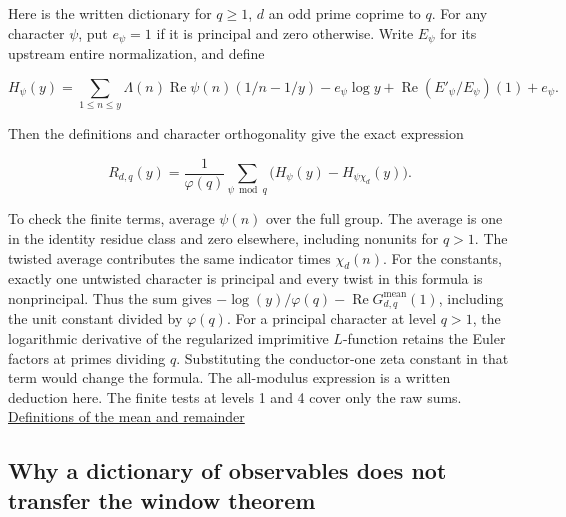 \documentclass[11pt,letterpaper]{article}
\begin{document}
Here is the written dictionary for $q\ge 1$, $d$ an odd prime coprime to $q$. For any character $\psi $, put $e_\psi =1$ if it is principal and zero otherwise. Write $E_\psi $ for its upstream entire normalization, and define

\[
H_\psi (y)=\sum_{1\le n\le y}\Lambda(n)\operatorname{Re}\psi (n)(1/n-1/y)
-e_\psi \log y+\operatorname{Re}(E'_\psi /E_\psi )(1)+e_\psi  .
\]

Then the definitions and character orthogonality give the exact expression

\[
R_{d,q}(y)=\frac1{\varphi(q)}
\sum_{\psi \bmod q}\bigl(H_\psi (y)-H_{\psi \chi _d}(y)\bigr).
\]

To check the finite terms, average $\psi (n)$ over the full group. The average is one in the identity residue class and zero elsewhere, including nonunits for $q>1$. The twisted average contributes the same indicator times $\chi _d(n)$. For the constants, exactly one untwisted character is principal and every twist in this formula is nonprincipal. Thus the sum gives $-\log(y)/\varphi(q)-\operatorname{Re} G^{\mathrm{mean}}_{d,q}(1)$, including the unit constant divided by $\varphi(q)$. For a principal character at level $q>1$, the logarithmic derivative of the regularized imprimitive $L$-function retains the Euler factors at primes dividing $q$. Substituting the conductor-one zeta constant in that term would change the formula. The all-modulus expression is a written deduction here. The finite tests at levels 1 and 4 cover only the raw sums. \href{https://github.com/nousentllc/riemann-hypothesis/blob/e063a923620ee7787b4a1270421478645bf66bdb/src/New/Reduction/Zeros/PrimeError.lean#L43-L68}{Definitions of the mean and remainder}

\subsection{Why a dictionary of observables does not transfer the window theorem}
\end{document}
